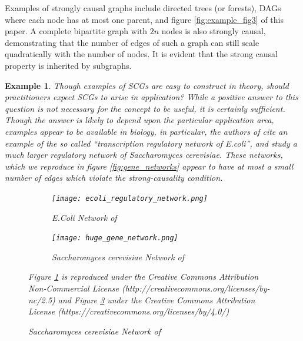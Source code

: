 \documentclass{statsoc}
\newtheorem{example}{Example}
\begin{document}
Examples of strongly causal graphs include directed trees (or
forests), DAGs where each node has at most one parent, and figure
\ref{fig:example_fig3} of this paper.  A complete bipartite graph with
$2n$ nodes is also strongly causal, demonstrating that the number of
edges of such a graph can still scale quadratically with the number of
nodes.  It is evident that the strong causal property is inherited by
subgraphs.

\begin{example}
  Though examples of SCGs are easy to construct in theory, should
  practitioners expect SCGs to arise in application?  While a positive
  answer to this question is not \textit{necessary} for the concept to
  be useful, it is certainly sufficient.  Though the answer is likely
  to depend upon the particular application area, examples appear to
  be available in biology, in particular, the authors of
  \cite{discovering_graphical_Granger_causality_using_the_truncating_lasso_penalty}
  cite an example of the so called ``transcription regulatory network
  of \textit{E.coli}'', and
  \cite{learning_genome_scale_regulatory_networks} study a much larger
  regulatory network of \textit{Saccharomyces cerevisiae}.  These
  networks, which we reproduce in figure \ref{fig:gene_networks}
  appear to have at most a small number of edges which violate the
  strong-causality condition.

  \begin{figure}[h]
    \centering
    \caption{Transcription Regulatory Networks}
    \label{fig:gene_networks}
    \begin{subfigure}[b]{0.45\textwidth}
      \caption{\textit{E.Coli} Network of
        \cite{discovering_graphical_Granger_causality_using_the_truncating_lasso_penalty}}
      \label{fig:gene_network1}
      \texttt{[image: ecoli\_regulatory\_network.png]}
    \end{subfigure}
    \begin{subfigure}[b]{0.45\textwidth}
      \caption{\textit{Saccharomyces cerevisiae} Network of
        \cite{learning_genome_scale_regulatory_networks}}
      \label{fig:gene_network2}
      \texttt{[image: huge\_gene\_network.png]}
    \end{subfigure}

  {\footnotesize Figure \ref{fig:gene_network1}
    is reproduced under the Creative Commons Attribution
    Non-Commercial License
    (http://creativecommons.org/licenses/by-nc/2.5) and Figure
    \ref{fig:gene_network2} under the Creative Commons Attribution
    License (https://creativecommons.org/licenses/by/4.0/)}
  \end{figure}
\end{example}
\end{document}
